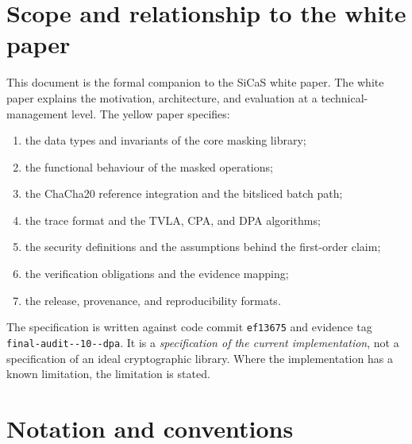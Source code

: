 \documentclass[11pt,a4paper]{article}
\newcommand{\codecommit}{\texttt{ef13675}}
\newcommand{\evidencetag}{\texttt{final-\allowbreak audit-\allowbreak 2026-10-\allowbreak 31-\allowbreak dpa}}
\theoremstyle{plain}
\theoremstyle{definition}
\theoremstyle{remark}
\begin{document}
\section{Scope and relationship to the white paper}

This document is the formal companion to the SiCaS white paper. The white paper
explains the motivation, architecture, and evaluation at a technical-management level.
The yellow paper specifies:

\begin{enumerate}[leftmargin=1.5em]
  \item the data types and invariants of the core masking library;
  \item the functional behaviour of the masked operations;
  \item the ChaCha20 reference integration and the bitsliced batch path;
  \item the trace format and the TVLA, CPA, and DPA algorithms;
  \item the security definitions and the assumptions behind the first-order claim;
  \item the verification obligations and the evidence mapping;
  \item the release, provenance, and reproducibility formats.
\end{enumerate}

The specification is written against code commit \codecommit{} and evidence tag
\evidencetag. It is a \emph{specification of the current implementation}, not a
specification of an ideal cryptographic library. Where the implementation has a known
limitation, the limitation is stated.

\section{Notation and conventions}
\end{document}
